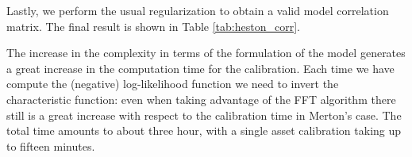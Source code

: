 Lastly, we perform the usual regularization to obtain a valid model correlation matrix.
The final result is shown in Table \ref{tab:heston_corr}.

The increase in the complexity in terms of the formulation of the model generates a great increase in the computation time for the calibration. Each time we have compute the (negative) log-likelihood function we need to invert the characteristic function: even when taking advantage of the FFT algorithm there still is a great increase with respect to the calibration time in Merton's case. The total time amounts to about three hour, with a single asset calibration taking up to fifteen minutes.

\begin{table}
	\tiny
  \centering
  \caption{Resulting correlation matrix for Heston. The values are percentages and the colour scheme is the usual.}
    \noindent{}
\end{table}

